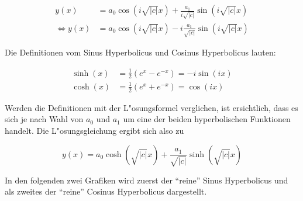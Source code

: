 \begin{equation}
	\begin{split}
	y(x) &= a_0 \cos(i\sqrt{|c|}x) + \frac{a_1}{i\sqrt{|c|}}\sin(i\sqrt{|c|}x) 
	\\
	\Leftrightarrow
	y(x) &= a_0 \cos(i\sqrt{|c|}x) - i\frac{a_1}{\sqrt{|c|}}\sin(i\sqrt{|c|}x)
	\end{split}	
	\label{wellen:LSGnegcWerte}
\end{equation}

Die Definitionen vom Sinus Hyperbolicus und Cosinus Hyperbolicus lauten:

\begin{equation*}
	\begin{split}
	\sinh(x) &= \frac{1}{2} (e^x - e^{-x}) = -i \sin(ix)\\
	\cosh(x) &= \frac{1}{2} (e^x + e^{-x}) = \cos (ix)
	\end{split}
\end{equation*}

Werden die Definitionen mit der L"osungsformel verglichen, ist ersichtlich, 
dass es sich je nach Wahl von $a_0$ und $a_1$ um eine der beiden hyperbolischen 
Funktionen handelt. Die L"osungsgleichung ergibt sich also zu

\begin{equation}
	y(x) = a_0 \cosh(\sqrt{|c|}x) + \frac{a_1}{\sqrt{|c|}}\sinh(\sqrt{|c|}x)
	\label{wellen:LSGhyperbolFunktion}
\end{equation}

In den folgenden zwei Grafiken wird zuerst der ``reine'' Sinus Hyperbolicus und 
als zweites der ``reine'' Cosinus Hyperbolicus dargestellt.

